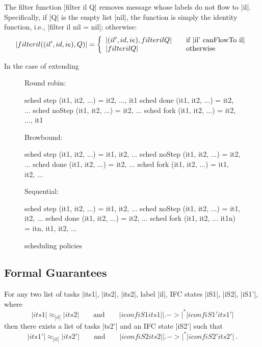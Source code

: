The filter function |filter il Q| removes message whose labels do not
flow to |il|. Specifically, if |Q| is the empty list |nil|, the
function is simply the identity function, i.e.,
|filter il nil = nil|; otherwise:
\[
|filter il ((il', id, ie) , Q )| = \left\{
\begin{array}{l l}
|(il', id, ie) , filter il Q| & \quad \text{if |il' canFlowTo il|}\\
|filter il Q| & \quad \text{otherwise}
\end{array} \right.
\]


In the case of extending

\begin{figure}
  Round robin:
\begin{code}
  sched step (it1, it2, ...)    = {it2, ..., it1}
  sched done (it1, it2, ...)    = {it2, ...}
  sched noStep (it1, it2, ...)  = {it2, ...}
  sched fork (it1, it2, ...)    = {it2, ..., it1}
\end{code}
  Browbound:
\begin{code}
  sched step (it1, it2, ...)    = {it1, it2, ...}
  sched noStep (it1, it2, ...)  = {it2, ...}
  sched done (it1, it2, ...)    = {it2, ...}
  sched fork (it1, it2, ...)    = {it1, it2, ...}
\end{code}
  Sequential:
\begin{code}
  sched step (it1, it2, ...)       = {it1, it2, ...}
  sched noStep (it1, it2, ...)     = {it1, it2, ...}
  sched done (it1, it2, ...)       = {it2, ...}
  sched fork (it1, it2, ... it1n)  = {itn, it1, it2, ...}
\end{code}
\caption{scheduling policies}
\end{figure}



\subsection{Formal Guarantees}

\begin{theorem}
  For any two list of tasks |its1|, |its2|, |its2|, label |il|,
  IFC states |iS1|, |iS2|, |iS1'|, where
  \begin{equation} \label{eq:tsni-lhs}
    |its1| \approx_{|il|} |its2|
    \qquad \text{and} \qquad
    |iconf iS1 its1| |.->|^* |iconf iS1' its1'|
  \end{equation}
  then there exists a list of tasks |ts2'| and an IFC state |iS2'| such that
  \begin{equation} \label{eq:tsni-rhs}
    |its1'| \approx_{|il|} |its2'|
     \qquad \text{and} \qquad
    |iconf iS2 its2| |.->|^* |iconf iS2' its2'|
    \ \text{.}
  \end{equation}
\end{theorem}

